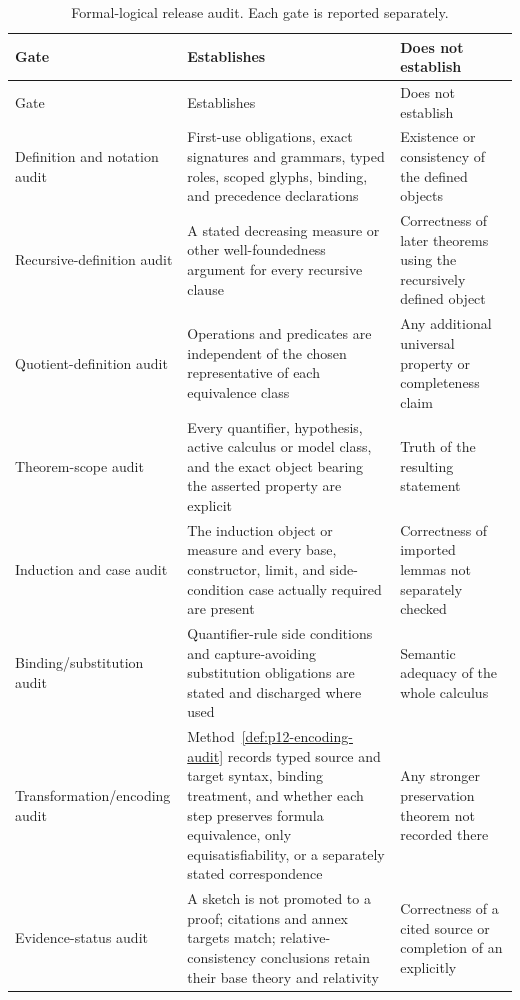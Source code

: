 \begin{landscape}
\thispagestyle{plain}
\begingroup\small
\begin{longtable}{@{}p{1.40in}p{2.35in}p{3.35in}@{}}
\caption{Formal-logical release audit.  Each gate is reported separately.}
\label{tab:p12-release-audit}\\
\toprule
Gate & Establishes & Does not establish \\ \midrule
\endfirsthead
\toprule
Gate & Establishes & Does not establish \\ \midrule
\endhead
Definition and notation audit & First-use obligations, exact signatures and
grammars, typed roles, scoped glyphs, binding, and precedence declarations &
Existence or consistency of the defined objects \\ \addlinespace
Recursive-definition audit & A stated decreasing measure or other
well-foundedness argument for every recursive clause & Correctness of later
theorems using the recursively defined object \\ \addlinespace
Quotient-definition audit & Operations and predicates are independent of the
chosen representative of each equivalence class & Any additional universal
property or completeness claim \\ \addlinespace
Theorem-scope audit & Every quantifier, hypothesis, active calculus or model
class, and the exact object bearing the asserted property are explicit & Truth
of the resulting statement \\ \addlinespace
Induction and case audit & The induction object or measure and every base,
constructor, limit, and side-condition case actually required are present &
Correctness of imported lemmas not separately checked \\ \addlinespace
Binding/substitution audit & Quantifier-rule side conditions and
capture-avoiding substitution obligations are stated and discharged where
used & Semantic adequacy of the whole calculus \\ \addlinespace
Transformation/encoding audit & Method~\ref{def:p12-encoding-audit} records
typed source and target syntax, binding treatment, and whether each step
preserves formula equivalence, only equisatisfiability, or a separately stated
correspondence & Any stronger preservation theorem not recorded there \\
\addlinespace
Evidence-status audit & A sketch is not promoted to a proof; citations and
annex targets match; relative-consistency conclusions retain their base theory
and relativity & Correctness of a cited source or completion of an explicitly

\end{longtable}
\end{landscape}
